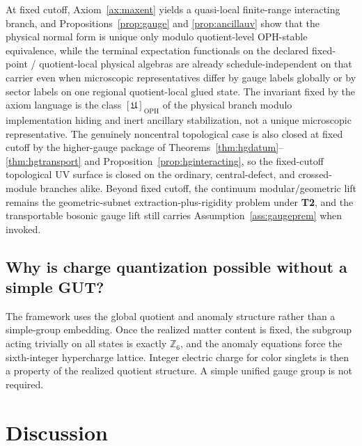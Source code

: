 \documentclass[11pt]{article}
\begin{document}
At fixed cutoff, Axiom~\ref{ax:maxent} yields a quasi-local finite-range interacting branch, and Propositions~\ref{prop:gauge} and \ref{prop:ancillauv} show that the physical normal form is unique only modulo quotient-level OPH-stable equivalence, while the terminal expectation functionals on the declared fixed-point / quotient-local physical algebras are already schedule-independent on that carrier even when microscopic representatives differ by gauge labels globally or by sector labels on one regional quotient-local glued state. The invariant fixed by the axiom language is the class \([\mathfrak U]_{\mathrm{OPH}}\) of the physical branch modulo implementation hiding and inert ancillary stabilization, not a unique microscopic representative. The genuinely noncentral topological case is also closed at fixed cutoff by the higher-gauge package of Theorems~\ref{thm:hgdatum}--\ref{thm:hgtransport} and Proposition~\ref{prop:hginteracting}, so the fixed-cutoff topological UV surface is closed on the ordinary, central-defect, and crossed-module branches alike. Beyond fixed cutoff, the continuum modular/geometric lift remains the geometric-subnet extraction-plus-rigidity problem under \textbf{T2}, and the transportable bosonic gauge lift still carries Assumption~\ref{ass:gaugeprem} when invoked.

\subsection{Why is charge quantization possible without a simple GUT?}

The framework uses the global quotient and anomaly structure rather than a simple-group embedding. Once the realized matter content is fixed, the subgroup acting trivially on all states is exactly $\mathbb Z_6$, and the anomaly equations force the sixth-integer hypercharge lattice. Integer electric charge for color singlets is then a property of the realized quotient structure. A simple unified gauge group is not required.

\section{Discussion}
\end{document}

